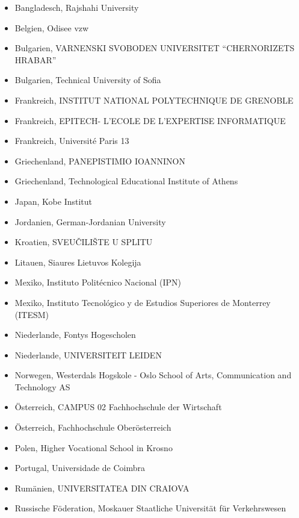\begin{itemize}
\tightlist
\item
  Bangladesch, Rajshahi University\\
\item
  Belgien, Odisee vzw
\item
  Bulgarien, VARNENSKI SVOBODEN UNIVERSITET ``CHERNORIZETS HRABAR''
\item
  Bulgarien, Technical University of Sofia
\item
  Frankreich, INSTITUT NATIONAL POLYTECHNIQUE DE GRENOBLE\\
\item
  Frankreich, EPITECH- L'ECOLE DE L'EXPERTISE INFORMATIQUE
\item
  Frankreich, Université Paris 13
\item
  Griechenland, PANEPISTIMIO IOANNINON
\item
  Griechenland, Technological Educational Institute of Athens
\item
  Japan, Kobe Institut\\
\item
  Jordanien, German-Jordanian University\\
\item
  Kroatien, SVEUČILIŠTE U SPLITU
\item
  Litauen, Siaures Lietuvos Kolegija
\item
  Mexiko, Instituto Politécnico Nacional (IPN)\\
\item
  Mexiko, Instituto Tecnológico y de Estudios Superiores de Monterrey
  (ITESM)\\
\item
  Niederlande, Fontys Hogescholen
\item
  Niederlande, UNIVERSITEIT LEIDEN\\
\item
  Norwegen, Westerdals Hogskole - Oslo School of Arts, Communication and
  Technology AS
\item
  Österreich, CAMPUS 02 Fachhochschule der Wirtschaft
\item
  Österreich, Fachhochschule Oberösterreich
\item
  Polen, Higher Vocational School in Krosno
\item
  Portugal, Universidade de Coimbra
\item
  Rumänien, UNIVERSITATEA DIN CRAIOVA
\item
  Russische Föderation, Moskauer Staatliche Universität für
  Verkehrswesen\\

\end{itemize}
